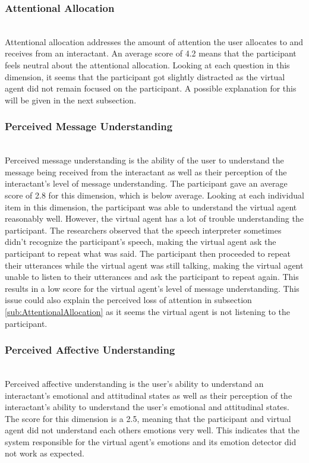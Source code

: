 \subsubsection{Attentional Allocation}~\\
\label{sub:AttentionalAllocation}
Attentional allocation addresses the amount of attention the user allocates to and receives from an interactant.
An average score of 4.2 means that the participant feels neutral about the attentional allocation. Looking at each question in this dimension, it seems that the participant got slightly distracted as the virtual agent did not remain focused on the participant. A possible explanation for this will be given in the next subsection. 

\subsubsection{Perceived Message Understanding}~\\
Perceived message understanding is the ability of the user to understand the message being received from the interactant as well as their perception of the interactant’s level of message understanding.
The participant gave an average score of 2.8 for this dimension, which is below average. Looking at each individual item in this dimension, the participant was able to understand the virtual agent reasonably well. However, the virtual agent has a lot of trouble understanding the participant. The researchers observed that the speech interpreter sometimes didn't recognize the participant's speech, making the virtual agent ask the participant to repeat what was said. The participant then proceeded to repeat their utterances while the virtual agent was still talking, making the virtual agent unable to listen to their utterances and ask the participant to repeat again. This results in a low score for the virtual agent's level of message understanding. This issue could also explain the perceived loss of attention in subsection \ref{sub:AttentionalAllocation} as it seems the virtual agent is not listening to the participant.

\subsubsection{Perceived Affective Understanding}~\\
\label{sub:PerceivedAffective}
Perceived affective understanding is the user’s ability to understand an interactant’s emotional and attitudinal states as well as their perception of the interactant’s ability to understand the user’s emotional and attitudinal states. The score for this dimension is a 2.5, meaning that the participant and virtual agent did not understand each others emotions very well. This indicates that the system responsible for the virtual agent's emotions and its emotion detector did not work as expected.

